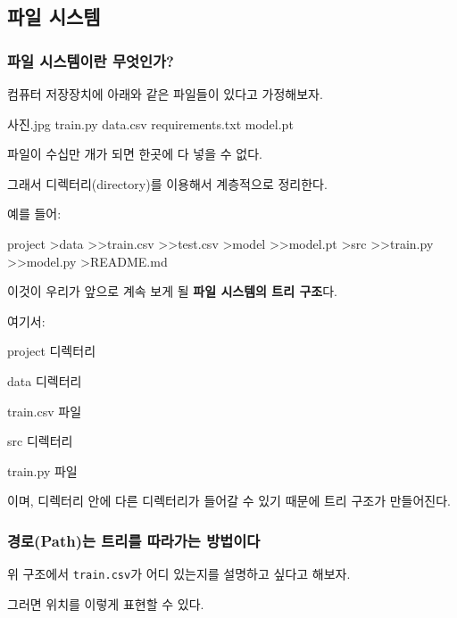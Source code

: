 

\subsection{파일 시스템}

\subsubsection{파일 시스템이란 무엇인가?}

컴퓨터 저장장치에 아래와 같은 파일들이 있다고 가정해보자.

\begin{dhkzsh}
사진.jpg
train.py
data.csv
requirements.txt
model.pt
\end{dhkzsh}

파일이 수십만 개가 되면 한곳에 다 넣을 수 없다.

그래서 디렉터리(directory)를 이용해서 계층적으로 정리한다.

예를 들어:

\begin{dhkdir}[in=8]
project
>data
>>train.csv
>>test.csv
>model
>>model.pt
>src
>>train.py
>>model.py
>README.md
\end{dhkdir}

이것이 우리가 앞으로 계속 보게 될 \textbf{파일 시스템의 트리 구조}다.

여기서:

\begin{dhksmry}[centered]
project \ra 디렉터리

data \ra 디렉터리

train.csv \ra 파일

src \ra 디렉터리

train.py \ra 파일
\end{dhksmry}

이며, 디렉터리 안에 다른 디렉터리가 들어갈 수 있기 때문에 트리 구조가 만들어진다.

\subsubsection{경로(Path)는 트리를 따라가는 방법이다}

위 구조에서 \texttt{train.csv}가 어디 있는지를 설명하고 싶다고 해보자.

그러면 위치를 이렇게 표현할 수 있다.

